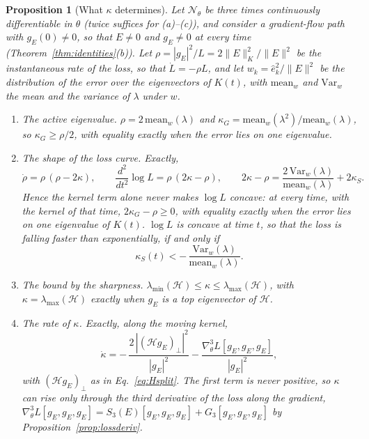 \documentclass[11pt]{article}
\newtheorem{proposition}{Proposition}
\theoremstyle{definition}
\theoremstyle{remark}
\newcommand{\Net}{\mathcal{N}_\theta}    %
\newcommand{\Hess}{\mathcal{H}}          %
\begin{document}
\begin{proposition}[What $\kappa$ determines]\label{prop:whykappa}
Let $\Net$ be three times continuously differentiable in $\theta$ (twice suffices for (a)--(c)), and consider a gradient-flow path with $g_E(0)\neq0$, so that $E\neq0$ and $g_E\neq0$ at every time (Theorem~\ref{thm:identities}(b)).
Let $\rho =|g_E|^2/L = 2\|E\|_K^2/\|E\|^2$ be the instantaneous rate of the loss, so that $\dot L = -\rho L$, and let $w_k = \hat e_k^2/\|E\|^2$ be the distribution of the error over the eigenvectors of $K(t)$, with $\mathrm{mean}_w$ and $\mathrm{Var}_w$ the mean and the variance of $\lambda$ under $w$.
\begin{enumerate}[label=(\alph*)]
\item \emph{The active eigenvalue.} $\rho = 2\,\mathrm{mean}_w(\lambda)$ and $\kappa_G = \mathrm{mean}_w(\lambda^2)/\mathrm{mean}_w(\lambda)$, so $\kappa_G\ge\rho/2$, with equality exactly when the error lies on one eigenvalue.
\item \emph{The shape of the loss curve.} Exactly,
\begin{equation}\label{eq:rho}
\dot\rho = \rho\,(\rho - 2\kappa),\qquad
\frac{d^2}{dt^2}\log L = \rho\,(2\kappa - \rho),\qquad
2\kappa - \rho = \frac{2\,\mathrm{Var}_w(\lambda)}{\mathrm{mean}_w(\lambda)} + 2\kappa_S .
\end{equation}
Hence the kernel term alone never makes $\log L$ concave: at every time, with the kernel of that time, $2\kappa_G - \rho\ge0$, with equality exactly when the error lies on one eigenvalue of $K(t)$.
$\log L$ is concave at time $t$, so that the loss is falling faster than exponentially, if and only if
\begin{equation}\label{eq:logconcave}
\kappa_S(t) < -\,\frac{\mathrm{Var}_w(\lambda)}{\mathrm{mean}_w(\lambda)} .
\end{equation}
\item \emph{The bound by the sharpness.} $\lambda_{\min}(\Hess)\le\kappa\le\lambda_{\max}(\Hess)$, with $\kappa = \lambda_{\max}(\Hess)$ exactly when $g_E$ is a top eigenvector of $\Hess$.
\item \emph{The rate of $\kappa$.} Exactly, along the moving kernel,
\begin{equation}\label{eq:kappadot}
\dot\kappa = -\,\frac{2\,|(\Hess g_E)_\perp|^2}{|g_E|^2} - \frac{\nabla^3_\theta L[g_E,g_E,g_E]}{|g_E|^2},
\end{equation}
with $(\Hess g_E)_\perp$ as in Eq.~\eqref{eq:Hsplit}.
The first term is never positive, so $\kappa$ can rise only through the third derivative of the loss along the gradient, $\nabla^3_\theta L[g_E,g_E,g_E] = S_3(E)[g_E,g_E,g_E] + G_3[g_E,g_E,g_E]$ by Proposition~\ref{prop:lossderiv}.
\end{enumerate}
\end{proposition}
\end{document}
